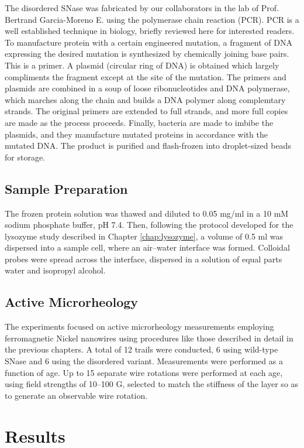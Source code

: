 The disordered SNase was fabricated by our collaborators in the lab of Prof. Bertrand Garcia-Moreno E. using the polymerase chain reaction (PCR). PCR is a well established technique in biology, briefly reviewed here for interested readers. To manufacture protein with a certain engineered mutation, a fragment of DNA expressing the desired mutation is synthesized by chemically joining base pairs. This is a primer. A plasmid (circular ring of DNA) is obtained which largely compliments the fragment except at the site of the mutation. The primers and plasmids are combined in a soup of loose ribonucleotides and DNA polymerase, which marches along the chain and builds a DNA polymer along complemtary strands. The original primers are extended to full strands, and more full copies are made as the process proceeds. Finally, bacteria are made to imbibe the plasmids, and they manufacture mutated proteins in accordance with the mutated DNA. The product is purified and flash-frozen into droplet-sized beads for storage.

\subsection{Sample Preparation}

The frozen protein solution was thawed and diluted to 0.05 mg/ml in a 10 mM sodium phosphate buffer, pH 7.4. Then, following the protocol developed for the lysozyme study described in Chapter \ref{chap:lysozyme}, a volume of 0.5 ml was dispersed into a sample cell, where an air--water interface was formed. Colloidal probes were spread across the interface, dispersed in a solution of equal parts water and isopropyl alcohol.

\subsection{Active Microrheology}

The experiments focused on active microrheology measurements employing ferromagnetic Nickel nanowires using procedures like those described in detail in the previous chapters. A total of 12 trails were conducted, 6 using wild-type SNase and 6 using the disordered variant. Measurements were performed as a function of age. Up to 15 separate wire rotations were performed at each age, using field strengths of 10--100 G, selected to match the stiffness of the layer so as to generate an observable wire rotation.


\section{Results}
